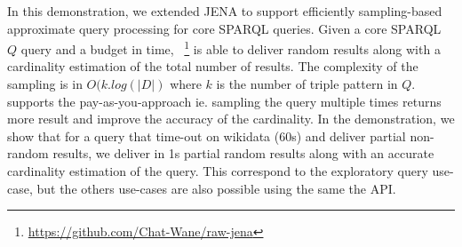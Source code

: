 In this demonstration, we extended JENA to support efficiently
sampling-based approximate query processing for core SPARQL queries.
Given a core SPARQL $Q$ query and a budget in time,
\NAME~\footnote{\url{https://github.com/Chat-Wane/raw-jena}} is
able to deliver random results along with a cardinality estimation of
the total number of results. The complexity of the sampling is in
$O(k.log(|D|)$ where $k$ is the number of triple pattern in
$Q$. \NAME supports the pay-as-you-approach ie. sampling the query
multiple times returns more result and improve the accuracy of the
cardinality.
%
In the demonstration, we show that for a query that time-out on
wikidata (60s) and deliver partial non-random results, we deliver in
1s partial random results along with an accurate cardinality
estimation of the query. This correspond to the exploratory query
use-case, but the others use-cases are also possible using the same
the API.









